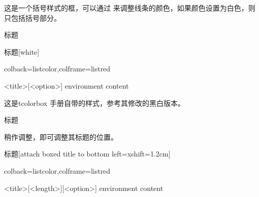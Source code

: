 \documentclass[fontset=none]{ctexart}
\begin{document}
	这是一个括号样式的框，可以通过  来调整线条的颜色，如果颜色设置为白色，则只包括括号部分。 
	
	\begin{dispExample}
		\begin{ascolorbox17}[子标题]{标题}
			\zhlipsum[1]
		\end{ascolorbox17}
	\end{dispExample}
	
	
	\begin{dispExample}
		\begin{ascolorbox17}[子标题]{标题}[white]
			\zhlipsum[1]
		\end{ascolorbox17}
	\end{dispExample}
	
	
	
	
	
	
	\begin{dispListing*}{colback=listcolor,colframe=listred}
		\begin{ascolorbox18}{<title>}[<option>]
			environment content
		\end{ascolorbox18}
	\end{dispListing*}
	
	这是tcolorbox 手册自带的样式，参考其修改的黑白版本。
	
	\begin{dispExample}
		\begin{ascolorbox18}{标题}
			\zhlipsum[1]
		\end{ascolorbox18}
	\end{dispExample}
	
	
	稍作调整，即可调整其标题的位置。
	
	
	\begin{dispExample}
		\begin{ascolorbox18}{标题}[attach boxed title to bottom left={xshift=1.2cm}]
			\zhlipsum[1]
		\end{ascolorbox18}
	\end{dispExample}
	
	
	
	
	
	
	
	
	
	
	
	
	\begin{dispListing*}{colback=listcolor,colframe=listred}
		\begin{ascolorbox19}[<subtitle>]{<title>}[<length>][<option>]
			environment content
		\end{ascolorbox19}
	\end{dispListing*}
	
\end{document}
